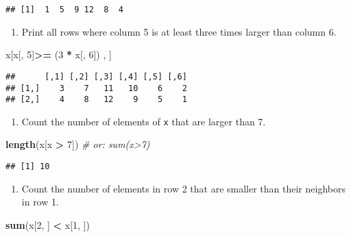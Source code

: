 \documentclass[]{article}
\newenvironment{Shaded}{\begin{snugshade}}{\end{snugshade}}
\newcommand{\KeywordTok}[1]{\textcolor[rgb]{0.13,0.29,0.53}{\textbf{#1}}}
\newcommand{\DecValTok}[1]{\textcolor[rgb]{0.00,0.00,0.81}{#1}}
\newcommand{\StringTok}[1]{\textcolor[rgb]{0.31,0.60,0.02}{#1}}
\newcommand{\CommentTok}[1]{\textcolor[rgb]{0.56,0.35,0.01}{\textit{#1}}}
\newcommand{\OperatorTok}[1]{\textcolor[rgb]{0.81,0.36,0.00}{\textbf{#1}}}
\newcommand{\NormalTok}[1]{#1}
\providecommand{\tightlist}{%
  \setlength{\itemsep}{0pt}\setlength{\parskip}{0pt}}
\begin{document}
\begin{verbatim}
## [1]  1  5  9 12  8  4
\end{verbatim}

\begin{enumerate}
\def\labelenumi{\arabic{enumi}.}
\setcounter{enumi}{2}
\tightlist
\item
  Print all rows where column 5 is at least three times larger than
  column 6.
\end{enumerate}

\begin{Shaded}
\begin{Highlighting}[]
\NormalTok{x[x[, }\DecValTok{5}\NormalTok{]}\OperatorTok{>=}\StringTok{ }\NormalTok{(}\DecValTok{3} \OperatorTok{*}\StringTok{ }\NormalTok{x[, }\DecValTok{6}\NormalTok{]) , ]  }
\end{Highlighting}
\end{Shaded}

\begin{verbatim}
##      [,1] [,2] [,3] [,4] [,5] [,6]
## [1,]    3    7   11   10    6    2
## [2,]    4    8   12    9    5    1
\end{verbatim}

\begin{enumerate}
\def\labelenumi{\arabic{enumi}.}
\setcounter{enumi}{3}
\tightlist
\item
  Count the number of elements of \texttt{x} that are larger than 7.
\end{enumerate}

\begin{Shaded}
\begin{Highlighting}[]
\KeywordTok{length}\NormalTok{(x[x }\OperatorTok{>}\StringTok{ }\DecValTok{7}\NormalTok{])  }\CommentTok{# or: sum(x>7)}
\end{Highlighting}
\end{Shaded}

\begin{verbatim}
## [1] 10
\end{verbatim}

\begin{enumerate}
\def\labelenumi{\arabic{enumi}.}
\setcounter{enumi}{4}
\tightlist
\item
  Count the number of elements in row 2 that are smaller than their
  neighbors in row 1.
\end{enumerate}

\begin{Shaded}
\begin{Highlighting}[]
\KeywordTok{sum}\NormalTok{(x[}\DecValTok{2}\NormalTok{, ] }\OperatorTok{<}\StringTok{ }\NormalTok{x[}\DecValTok{1}\NormalTok{, ])}
\end{Highlighting}
\end{Shaded}
\end{document}
